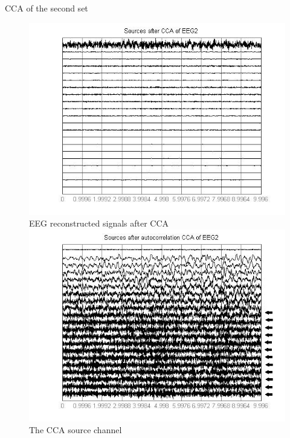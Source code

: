 \documentclass[t,12pt,english
\ifx\beamermode\undefined\else,\beamermode\fi
]{beamer}
\begin{document}
    
\begin{frame}{CCA of the second set}

\begin{figure}[!htbp]
%
\centering
\includegraphics[width=1\textwidth]{6.jpg}\\
\tiny{EEG reconstructed signals after CCA}
\endminipage\hfill
{}%
\centering
\includegraphics[width=1\textwidth]{7.jpg}\\
\tiny{The CCA source channel}
\endminipage\hfill
{}%
\centering

\end{figure}
\end{frame}
\end{document}
